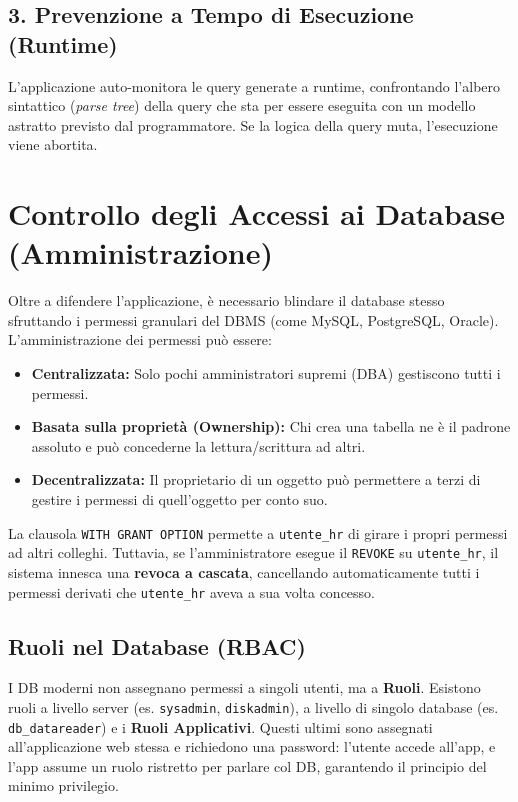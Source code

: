 \subsection{3. Prevenzione a Tempo di Esecuzione (Runtime)}
L'applicazione auto-monitora le query generate a runtime, confrontando l'albero sintattico (\textit{parse tree}) della query che sta per essere eseguita con un modello astratto previsto dal programmatore. Se la logica della query muta, l'esecuzione viene abortita.


\section{Controllo degli Accessi ai Database (Amministrazione)}

Oltre a difendere l'applicazione, è necessario blindare il database stesso sfruttando i permessi granulari del DBMS (come MySQL, PostgreSQL, Oracle). 
L'amministrazione dei permessi può essere:
\begin{itemize}
    \item \textbf{Centralizzata:} Solo pochi amministratori supremi (DBA) gestiscono tutti i permessi.
    \item \textbf{Basata sulla proprietà (Ownership):} Chi crea una tabella ne è il padrone assoluto e può concederne la lettura/scrittura ad altri.
    \item \textbf{Decentralizzata:} Il proprietario di un oggetto può permettere a terzi di gestire i permessi di quell'oggetto per conto suo.
\end{itemize}


\begin{warnbox}
La clausola \texttt{WITH GRANT OPTION} permette a \texttt{utente\_hr} di girare i propri permessi ad altri colleghi. Tuttavia, se l'amministratore esegue il \texttt{REVOKE} su \texttt{utente\_hr}, il sistema innesca una \textbf{revoca a cascata}, cancellando automaticamente tutti i permessi derivati che \texttt{utente\_hr} aveva a sua volta concesso.
\end{warnbox}

\subsection{Ruoli nel Database (RBAC)}
I DB moderni non assegnano permessi a singoli utenti, ma a \textbf{Ruoli}.
Esistono ruoli a livello server (es. \texttt{sysadmin}, \texttt{diskadmin}), a livello di singolo database (es. \texttt{db\_datareader}) e i \textbf{Ruoli Applicativi}. Questi ultimi sono assegnati all'applicazione web stessa e richiedono una password: l'utente accede all'app, e l'app assume un ruolo ristretto per parlare col DB, garantendo il principio del minimo privilegio.


